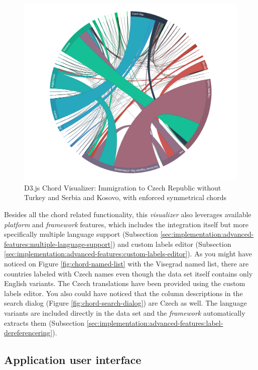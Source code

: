 \begin{figure}
	\centering
	\includegraphics[width=145mm]{img/06_chord_immigration_to_cr_3}
	\caption{D3.js Chord Visualizer: Immigration to Czech Republic without Turkey and Serbia and Kosovo, with enforced symmetrical chords}
    \label{fig:chord-immigration-to-cr-3}
\end{figure}

Besides all the chord related functionality, this \emph{visualizer} also leverages available \emph{platform} and \emph{framework} features, which includes the integration itself but more specifically multiple language support (Subsection \ref{sec:implementation:advanced-features:multiple-language-support}) and custom labels editor (Subsection \ref{sec:implementation:advanced-features:custom-labels-editor}). As you might have noticed on Figure \ref{fig:chord-named-list} with the Visegrad named list, there are countries labeled with Czech names even though the data set itself contains only English variants. The Czech translations have been provided using the custom labels editor. You also could have noticed that the column descriptions in the search dialog (Figure \ref{fig:chord-search-dialog}) are Czech as well. The language variants are included directly in the data set and the \emph{framework} automatically extracts them (Subsection \ref{sec:implementation:advanced-features:label-dereferencering}).

\subsection{Application user interface}

